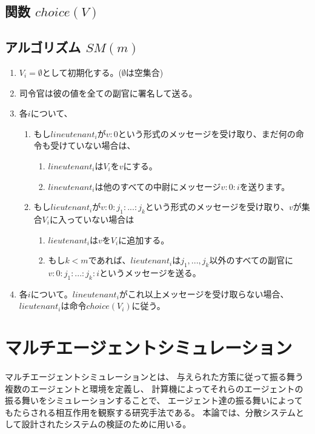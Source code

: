 \subsection{関数 $choice(V)$}


\subsection{アルゴリズム $SM(m)$}
\begin{enumerate}
  \item $V_i=\emptyset$として初期化する。($\emptyset$は空集合)
  \item 司令官は彼の値を全ての副官に署名して送る。
  \item 各$i$について、 
  \begin{enumerate}
    \item もし$lineutenant_i$が$v:0$という形式のメッセージを受け取り、まだ何の命令も受けていない場合は、
    \begin{enumerate}
      \item $lineutenant_i$は$ V_i$を${v}$にする。 
      \item $lineutenant_i$は他のすべての中尉にメッセージ$v:0:i$を送ります。
    \end{enumerate}
    \item もし$lieutenant_i$が$v:0:j_1:...:j_k$という形式のメッセージを受け取り、$v$が集合$V_i$に入っていない場合は
    \begin{enumerate}
      \item $lieutenant_i$は$v$を$V_i$に追加する。
      \item もし$k<m$であれば、$lieutenant_i$は$j_1, ..., j_k$以外のすべての副官に$v:0:j_1:...:j_k:i$というメッセージを送る。
    \end{enumerate}
  \end{enumerate}
  \item 各$i$について。$lineutenant_i$がこれ以上メッセージを受け取らない場合、$lieutenant_i$は命令$choice(V_i)$に従う。
\end{enumerate}

\section{マルチエージェントシミュレーション}
マルチエージェントシミュレーションとは、
与えられた方策に従って振る舞う複数のエージェントと環境を定義し、
計算機によってそれらのエージェントの振る舞いをシミュレーションすることで、
エージェント達の振る舞いによってもたらされる相互作用を観察する研究手法である。
本論では、分散システムとして設計されたシステムの検証のために用いる。

